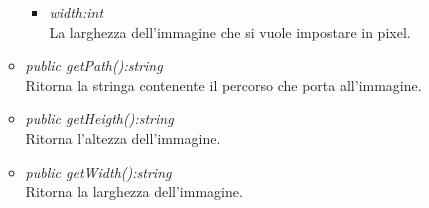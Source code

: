 \begin{itemize}
\begin{itemize}
\begin{itemize}
		\item \textit{width:int}\\
		La larghezza dell'immagine che si vuole impostare  in pixel.
		\end{itemize} 
	\item \textit{public getPath():string}\\
	Ritorna la stringa contenente il percorso che porta all'immagine.
	\item \textit{public getHeigth():string}\\
	Ritorna l'altezza dell'immagine.
	\item \textit{public getWidth():string}\\
	Ritorna la larghezza dell'immagine.
	\end{itemize}
\end{itemize}
